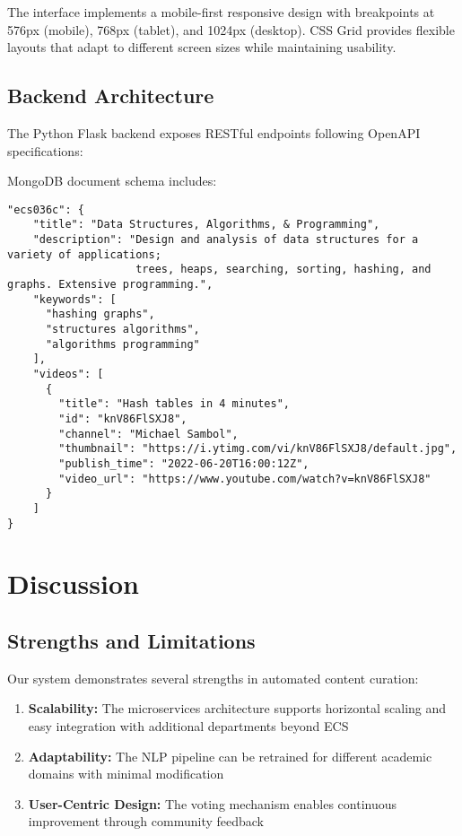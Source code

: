 \documentclass[manuscript,nonacm]{acmart}
\begin{document}
The interface implements a mobile-first responsive design with breakpoints at 576px (mobile), 768px (tablet), and 1024px (desktop). CSS Grid provides flexible layouts that adapt to different screen sizes while maintaining usability.

\subsection{Backend Architecture}

The Python Flask backend exposes RESTful endpoints following OpenAPI specifications:

MongoDB document schema includes:
\\
\begin{verbatim}
"ecs036c": {
    "title": "Data Structures, Algorithms, & Programming",
    "description": "Design and analysis of data structures for a variety of applications;
                    trees, heaps, searching, sorting, hashing, and graphs. Extensive programming.",
    "keywords": [
      "hashing graphs",
      "structures algorithms",
      "algorithms programming"
    ],
    "videos": [
      {
        "title": "Hash tables in 4 minutes",
        "id": "knV86FlSXJ8",
        "channel": "Michael Sambol",
        "thumbnail": "https://i.ytimg.com/vi/knV86FlSXJ8/default.jpg",
        "publish_time": "2022-06-20T16:00:12Z",
        "video_url": "https://www.youtube.com/watch?v=knV86FlSXJ8"
      }
    ]
}
\end{verbatim}

\section{Discussion}

\subsection{Strengths and Limitations}

Our system demonstrates several strengths in automated content curation:

\begin{enumerate}
    \item \textbf{Scalability:} The microservices architecture supports horizontal scaling and easy integration with additional departments beyond ECS
    \item \textbf{Adaptability:} The NLP pipeline can be retrained for different academic domains with minimal modification
    \item \textbf{User-Centric Design:} The voting mechanism enables continuous improvement through community feedback
\end{enumerate}
\end{document}
